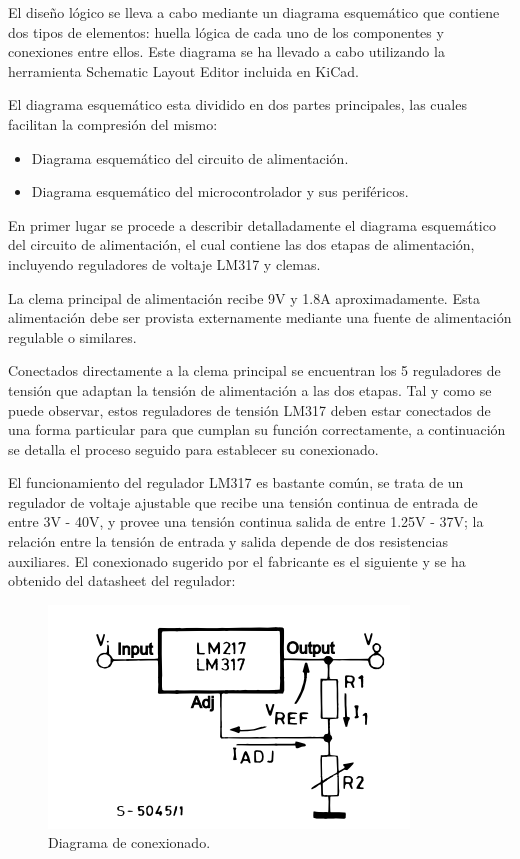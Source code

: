 El diseño lógico se lleva a cabo mediante un diagrama esquemático que contiene dos tipos de elementos: huella lógica de cada uno de los componentes y conexiones entre ellos. Este diagrama se ha llevado a cabo utilizando la herramienta Schematic Layout Editor incluida en KiCad.

El diagrama esquemático esta dividido en dos partes principales, las cuales facilitan la compresión del mismo:
\begin{itemize}
    \item Diagrama esquemático del circuito de alimentación.
    \item Diagrama esquemático del microcontrolador y sus periféricos.
\end{itemize}

En primer lugar se procede a describir detalladamente el diagrama esquemático del circuito de alimentación, el cual contiene las dos etapas de alimentación, incluyendo reguladores de voltaje LM317 y clemas.

La clema principal de alimentación recibe 9V y 1.8A aproximadamente. Esta alimentación debe ser provista externamente mediante una fuente de alimentación regulable o similares. 

Conectados directamente a la clema principal se encuentran los 5 reguladores de tensión que adaptan la tensión de alimentación a las dos etapas. Tal y como se puede observar, estos reguladores de tensión LM317 deben estar conectados de una forma particular para que cumplan su función correctamente, a continuación se detalla el proceso seguido para establecer su conexionado.

El funcionamiento del regulador LM317 es bastante común, se trata de un regulador de voltaje ajustable que recibe una tensión continua de entrada de entre 3V - 40V, y provee una tensión continua salida de entre 1.25V - 37V; la relación entre la tensión de entrada y salida depende de dos resistencias auxiliares. El conexionado sugerido por el fabricante es el siguiente y se ha obtenido del datasheet del regulador:

\begin{figure}[H]
    \centering 
    \includegraphics[width=.6\linewidth]{pictures/Lm317 conexionado.PNG}
    \caption{Diagrama de conexionado.}
    \label{fig:kdiagram}
\end{figure}


